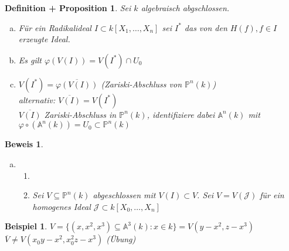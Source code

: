 \documentclass[a4paper,12pt]{report}
\theoremstyle{break}
\newtheorem{DefProp}[Def]{Definition + Proposition}
\theoremstyle{nonumberbreak}
\newtheorem{nnBsp}{Beispiel}
\newtheorem{Bew}{Beweis}
\theoremstyle{nonumberplain}
\newcommand{\quot}[1]{\textrm{\glqq}{#1}\textrm{\grqq}}
\newenvironment{twosidedproofeq}{\begin{enumerate}[\quot{$\subseteq$}:]}{\end{enumerate}}
\newcommand{\proofsubseteq}{\item[\quot{$\subseteq$}:]}
\newcommand{\proofsupseteq}{\item[\quot{$\supseteq$}:]}
\newcommand{\A}{\mathbb{A}}
\newcommand{\IP}{\mathbb{P}}%
\begin{document}
\begin{DefProp}
Sei $k$ algebraisch abgschlossen.\begin{enumerate}[a)]
\item
	F\"ur ein Radikalideal $I\subset k[X_1,\ldots ,X_n]$ sei $I^*$ das von den $H(f),f\in I$ erzeugte Ideal.

\item
	Es gilt $\varphi(V(I))=V(I^*)\cap U_0$

\item
	$V(I^*)=\overline{\varphi(V(I))}$ (Zariski-Abschluss von $\IP^n(k)$)\\
	alternativ: $\overline{V(I)}=V(I^*)$\\
	$\overline{V(I)}$ Zariski-Abschluss in $\IP^n(k)$, identifiziere dabei $\A^n(k)$ mit $\varphi\circ(\A^n(k))=U_0\subset\IP^n(k)$
\end{enumerate}\end{DefProp}

\begin{Bew}\begin{enumerate}[a)]\item[c)]\begin{twosidedproofeq}\proofsubseteq \checkmark \proofsupseteq
Sei $V\subseteq\IP^n(k)$ abgeschlossen mit $V(I)\subset V$. Sei $V=V(\mathcal J)$ f\"ur ein homogenes Ideal $\mathcal J\subset k[X_0,\ldots ,X_n]$
\end{twosidedproofeq}\end{enumerate}\end{Bew}

\begin{nnBsp}
$V=\{(x,x^2,x^3)\subseteq\A^3(k) : x\in k\}=V(y-x^2, z-x^3)$\\
$\overline V \ne V(x_0y-x^2,x_0^2z-x^3)$ (\"Ubung)
\end{nnBsp}
\end{document}
